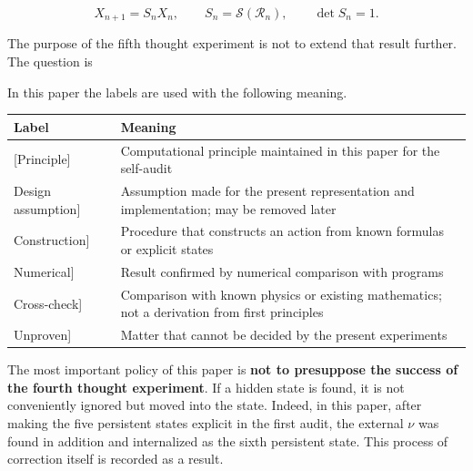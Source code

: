 \documentclass[
  a4paper,
]{article}
\newcounter{none} %
\begin{document}
\[
X_{n+1}=S_nX_n,
\qquad
S_n=\mathcal S(\mathcal R_n),
\qquad
\det S_n=1.
\]

The purpose of the fifth thought experiment is not to extend that result
further. The question is

\begin{center}
\end{center}

In this paper the labels are used with the following meaning.

{\def\LTcaptype{none} %
\begin{longtable}[]{@{}
  >{\raggedright\arraybackslash}p{}
  >{\raggedright\arraybackslash}p{}@{}}
\toprule\noalign{}
\begin{minipage}[b]{\linewidth}\raggedright
Label
\end{minipage} & \begin{minipage}[b]{\linewidth}\raggedright
Meaning
\end{minipage} \\
\midrule\noalign{}
\endhead
\bottomrule\noalign{}
\endlastfoot
{[}Principle{]} & Computational principle maintained in this paper for
the self-audit \\
{[}Design assumption{]} & Assumption made for the present representation
and implementation; may be removed later \\
{[}Construction{]} & Procedure that constructs an action from known
formulas or explicit states \\
{[}Numerical{]} & Result confirmed by numerical comparison with
programs \\
{[}Cross-check{]} & Comparison with known physics or existing
mathematics; not a derivation from first principles \\
{[}Unproven{]} & Matter that cannot be decided by the present
experiments \\
\end{longtable}
}

The most important policy of this paper is \textbf{not to presuppose the
success of the fourth thought experiment}. If a hidden state is found,
it is not conveniently ignored but moved into the state. Indeed, in this
paper, after making the five persistent states explicit in the first
audit, the external \(\nu\) was found in addition and internalized as
the sixth persistent state. This process of correction itself is
recorded as a result.
\end{document}
